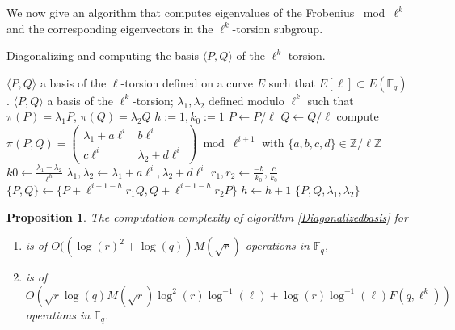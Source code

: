\documentclass{lms}
\newtheorem{prop}[thm]{Proposition}
\begin{document}
We now give an algorithm that computes eigenvalues of
the Frobenius $\bmod \ell^k$ and
the corresponding eigenvectors in the $\ell^{k}$-torsion subgroup.

\begin{algorithm}
\caption{\label{Diagonalizedbasis}Diagonalizing and computing the basis $\langle P,Q \rangle $ of the $\ell^k$ torsion.}
\begin{algorithmic}[5]
\REQUIRE $\langle P,Q \rangle$ a basis of the $\ell$-torsion defined on a curve $E$ such that $E[\ell] \subset E(\mathbb{F}_q)$ .
\ENSURE $\langle P,Q \rangle$ a basis of the $\ell^k$-torsion; $\lambda_1, \lambda_2$ defined modulo $\ell^k$ such that $\pi(P)=\lambda_1P$, $ \pi(Q)=\lambda_2Q$
\STATE $h:=1, k_0:=1$
\STATE $P \leftarrow P/\ell$
\STATE $Q \leftarrow Q/\ell$ 
\STATE compute $\pi(P,Q)=\left( \begin{array}{cc}
\lambda_1 + a\ell^{i} & b\ell^{i}\\
c\ell^{i} & \lambda_2 + d\ell^{i}
\end{array} \right) \bmod \ell^{i+1}$ with $\{a,b,c,d\} \in \mathbb{Z}/\ell\mathbb{Z}$
\STATE $k0 \leftarrow \frac{\lambda_1-\lambda_2}{\ell^h}$
\ENDIF
\STATE $\lambda_1, \lambda_2  \gets \lambda_1 + a\ell^i, \lambda_2 + d\ell^i$
\STATE $r_1,r_2 \gets \frac{-b }{k_0}, \frac{c }{k_0}$  
\STATE $\{P,Q\} \gets \{P+\ell^{i-1-h}r_1Q,Q+\ell^{i-1-h}r_2P\}$
\STATE $h \leftarrow h+1$
\ENDIF
\ENDFOR
\RETURN $\{P,Q,\lambda_1,\lambda_2\}$
\end{algorithmic}
\end{algorithm}

\begin{prop}
The computation complexity of algorithm \ref{Diagonalizedbasis} for 
\begin{enumerate}
\item[$\ell=2$] is of $O((\log(r)^2+\log(q)) M(\sqrt{r}) $ operations in $\mathbb{F}_q$, 
\item[$\ell \neq 2$] is of $O(\sqrt{r} \log(q) M(\sqrt{r})\log^2(r)\log^{-1}(\ell)+ \log(r)\log^{-1}(\ell) F(q,\ell^k))$ operations in $\mathbb{F}_q$.
\end{enumerate}
\end{prop}
\end{document}
